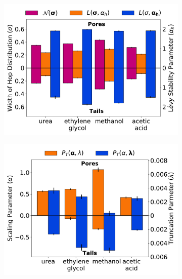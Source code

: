 \documentclass[journal=jctcce,manuscript=article]{achemso}
\begin{document}
  \begin{figure}
  \centering
  \begin{subfigure}{0.325\textwidth}
  \includegraphics[width=\textwidth]{2mode_AD_hops.pdf}
  \caption{}\label{fig:2mode_AD_hops}
  \end{subfigure}
  \begin{subfigure}{0.325\textwidth}
  \includegraphics[width=\textwidth]{2mode_AD_dwells.pdf}
  \caption{}\label{fig:2mode_AD_dwells}
  \end{subfigure}
  \begin{subfigure}{0.325\textwidth}

\end{subfigure}
\end{figure}
\end{document}
